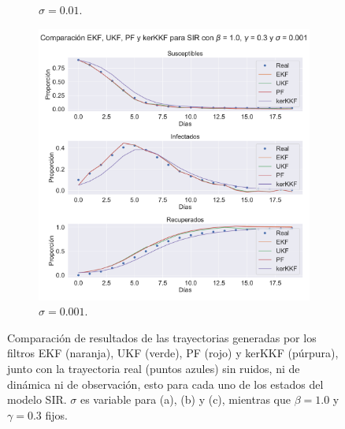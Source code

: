 \begin{figure}[h!]
\begin{subfigure}[b]{0.49\textwidth}
    \caption{$\sigma = 0.01$.}
    \label{fig:nonlinear_filters_sir_sigma_001}
    \end{subfigure}
    \begin{subfigure}[b]{0.49\textwidth}
        \includegraphics[width=0.9\linewidth]{img/content/chapter4/nonlinear_filters_sir_sigma_0001.pdf}
    \caption{$\sigma = 0.001$.}
    \label{fig:nonlinear_filters_sir_sigma_0001}
    \end{subfigure}
    \caption{Comparación de resultados de las trayectorias generadas por los filtros EKF (naranja), UKF (verde), PF (rojo) y kerKKF (púrpura), junto con la trayectoria real (puntos azules) sin ruidos, ni de dinámica ni de observación, esto para cada uno de los estados del modelo SIR. $\sigma$ es variable para (a), (b) y (c), mientras que $\beta = 1.0$ y $\gamma = 0.3$ fijos.}
\end{figure}


